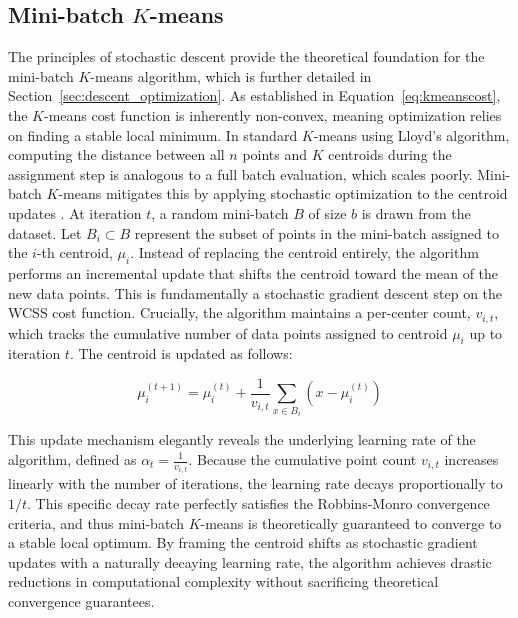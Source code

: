         \subsection{Mini-batch $K$-means}
        \label{subsec:minibatch_kmeans}
        The principles of stochastic descent provide the theoretical foundation for the mini-batch $K$-means algorithm, which is further detailed in Section~\ref{sec:descent_optimization}.
        As established in Equation~\ref{eq:kmeanscost}, the $K$-means cost function is inherently non-convex, meaning optimization relies on finding a stable local minimum.
        In standard $K$-means using Lloyd's algorithm, computing the distance between all $n$ points and $K$ centroids during the assignment step is analogous to a full batch evaluation, which scales poorly.
        Mini-batch $K$-means mitigates this by applying stochastic optimization to the centroid updates \cite{sculley_web-scale_2010}.
        At iteration $t$, a random mini-batch $B$ of size $b$ is drawn from the dataset.
        Let $B_i \subset B$ represent the subset of points in the mini-batch assigned to the $i$-th centroid, $\mu_i$.
        Instead of replacing the centroid entirely, the algorithm performs an incremental update that shifts the centroid toward the mean of the new data points.
        This is fundamentally a stochastic gradient descent step on the WCSS cost function.
        Crucially, the algorithm maintains a per-center count, $v_{i,t}$, which tracks the cumulative number of data points assigned to centroid $\mu_i$ up to iteration $t$.
        The centroid is updated as follows:
        
        \begin{equation}
            \mu_i^{(t+1)} = \mu_i^{(t)} + \frac{1}{v_{i, t}} \sum_{x \in B_i} \left( x - \mu_i^{(t)} \right)
        \end{equation}
        
        This update mechanism elegantly reveals the underlying learning rate of the algorithm, defined as $\alpha_t = \frac{1}{v_{i, t}}$.
        Because the cumulative point count $v_{i, t}$ increases linearly with the number of iterations, the learning rate decays proportionally to $1/t$.
        This specific decay rate perfectly satisfies the Robbins-Monro convergence criteria, and thus mini-batch $K$-means is theoretically guaranteed to converge to a stable local optimum.
        By framing the centroid shifts as stochastic gradient updates with a naturally decaying learning rate, the algorithm achieves drastic reductions in computational complexity without sacrificing theoretical convergence guarantees.
        
